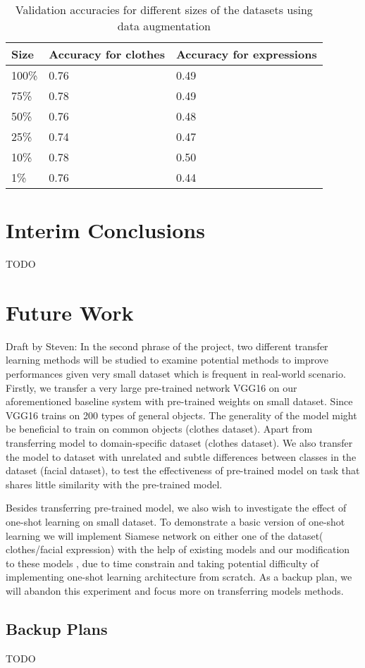 \documentclass{article}
\begin{document}
\begin{table*}[!htb]
  \centering
  \begin{tabular}{| l | l | l |}
    \hline
    \textbf{Size} & \textbf{Accuracy for clothes} & \textbf{Accuracy for expressions}\\ \hline
    100\% & 0.76 & 0.49\\ \hline
    75\% & 0.78  & 0.49\\ \hline
    50\% & 0.76 & 0.48\\ \hline
	25\% & 0.74 & 0.47\\ \hline
	10\% & 0.78 & 0.50\\ \hline
	1\% & 0.76 & 0.44\\ \hline

  \end{tabular}
  \caption{Validation accuracies for different sizes of the datasets using data augmentation}
  \label{tab:3}
\end{table*}


\section{Interim Conclusions}
\label{sec:conclusions}

TODO

\section{Future Work}
\label{sec:future}
Draft by Steven:
In the second phrase of the project, two different transfer learning methods will be studied to examine potential methods to improve performances given very small dataset which is frequent in real-world scenario. Firstly, we transfer a very large pre-trained network VGG16 on our aforementioned baseline system with pre-trained weights on small dataset. Since VGG16 trains on 200 types of general objects. The generality of the model might be beneficial to train on common objects (clothes dataset). Apart from transferring model to domain-specific dataset (clothes dataset). We also transfer the model to dataset with unrelated and subtle differences between classes in the dataset (facial dataset), to test the effectiveness of pre-trained model on task that shares little similarity with the pre-trained model.

Besides transferring pre-trained model, we also wish to investigate the effect of one-shot learning on small dataset. To demonstrate a basic version of one-shot learning we will implement Siamese network on either one of the dataset( clothes/facial expression) with the help of existing models and our modification to these models , due to time constrain and taking potential difficulty of implementing one-shot learning architecture from scratch. As a backup plan, we will abandon this experiment and focus more on transferring models methods.


\subsection{Backup Plans}
\label{sec:plans}

TODO




\end{document}
